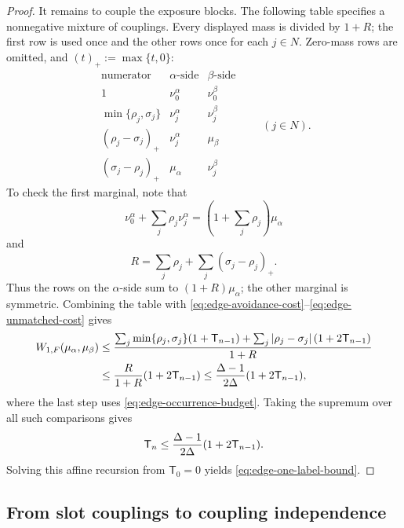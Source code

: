 \begin{proof}
It remains to couple the exposure blocks.  The following table specifies
a nonnegative mixture of couplings.  Every displayed mass is divided by
\(1+R\); the first row is used once and the other rows once for each
$j\in N$.  Zero-mass rows are omitted, and $(t)_+:=\max\{t,0\}$:
\[
\begin{array}{c|c|c}
 \text{numerator}&\alpha\text{-side}&\beta\text{-side}\\ \hline
 1&\nu_0^\alpha&\nu_0^\beta\\
 \min\{\rho_j,\sigma_j\}&\nu_j^\alpha&\nu_j^\beta\\
 (\rho_j-\sigma_j)_+&\nu_j^\alpha&\mu_\beta\\
 (\sigma_j-\rho_j)_+&\mu_\alpha&\nu_j^\beta
\end{array}
\qquad(j\in N).
\]
To check the first marginal, note that
\[
  \nu_0^\alpha+\sum_j\rho_j\nu_j^\alpha
  =\left(1+\sum_j\rho_j\right)\mu_\alpha
\]
and
\[
  R=\sum_j\rho_j+\sum_j(\sigma_j-\rho_j)_+.
\]
Thus the rows on the \(\alpha\)-side sum to
\((1+R)\mu_\alpha\); the other marginal is symmetric.  Combining the table
with \eqref{eq:edge-avoidance-cost}--\eqref{eq:edge-unmatched-cost} gives
\[
\begin{aligned}
  W_{1,F}(\mu_\alpha,\mu_\beta)
  &\le
  \frac{
    \sum_j\min\{\rho_j,\sigma_j\}(1+\mathsf T_{n-1})
    +\sum_j\left|\rho_j-\sigma_j\right|(1+2\mathsf T_{n-1})
  }{1+R}\\
  &\le
  \frac{R}{1+R}(1+2\mathsf T_{n-1})
  \le
  \frac{\Delta-1}{2\Delta}(1+2\mathsf T_{n-1}),
\end{aligned}
\]
where the last step uses \eqref{eq:edge-occurrence-budget}.  Taking the
supremum over all such comparisons gives
\[
 \mathsf T_n\le\frac{\Delta-1}{2\Delta}(1+2\mathsf T_{n-1}).
\]
Solving this affine recursion from \(\mathsf T_0=0\) yields
\eqref{eq:edge-one-label-bound}.
\end{proof}

\subsection{From slot couplings to coupling independence}

